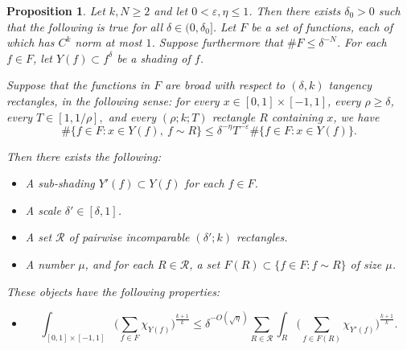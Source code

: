 \documentclass[letterpaper, reqno,11pt]{article}
\numberwithin{equation}{section}
\newcommand{\eps}{\varepsilon}
\newcommand{\itemizeEqnVSpacing}{\rule{0pt}{1pt}\vspace*{-12pt}}
\numberwithin{thm}{section}
\newtheorem{prop}[thm]{Proposition}
\theoremstyle{remark}
\begin{document}
\begin{prop}\label{rectangleDecompProp}
Let $k,N\geq 2$ and let $0<\eps,\eta\leq 1$. Then there exists $\delta_0>0$ such that the following is true for all $\delta\in (0,\delta_0]$. Let $F$ be a set of functions, each of which has $C^k$ norm at most $1$. Suppose furthermore that $\#F \leq \delta^{-N}$. For each $f\in F$, let $Y(f)\subset f^\delta$ be a shading of $f$. 


Suppose that the functions in $F$ are broad with respect to $(\delta,k)$ tangency rectangles, in the following sense: for every $x\in[0,1]\times[-1,1]$, every $\rho\geq\delta$, every $T\in [1, 1/\rho],$ and every $(\rho; k; T)$ rectangle $R$ containing $x$, we have
%
\begin{equation}\label{inductionPropHypothesis}
\#\{f\in F\colon x\in Y(f),\ f\sim R\}\leq\delta^{-\eta}T^{-\eps}\#\{f\in F\colon x\in Y(f)\}. 
\end{equation}

Then there exists the following:
\begin{itemize}
	\item A sub-shading $Y'(f)\subset Y(f)$ for each $f\in F$.
	\item A scale $\delta'\in [\delta,1]$.
	\item A set $\mathcal{R}$ of pairwise incomparable $(\delta'; k)$ rectangles.
	\item A number $\mu$, and for each $R\in\mathcal{R}$, a set $F(R)\subset \{f\in F\colon f\sim R\}$ of size $\mu$.
\end{itemize}
These objects have the following properties:
\begin{itemize}
\item[(A)] \itemizeEqnVSpacing
\begin{equation}\label{LkBdControlledBySumOverRect}
\int_{[0,1]\times[-1,1]}\Big(\sum_{f\in F}\chi_{Y(f)}\Big)^{\frac{k+1}{k}}\leq \delta^{-O(\sqrt\eta)}\sum_{R\in\mathcal{R}} \int_{R}\Big(\sum_{f\in F(R)}\chi_{Y'(f)}\Big)^{\frac{k+1}{k}}.
\end{equation}


\end{itemize}
\end{prop}
\end{document}
